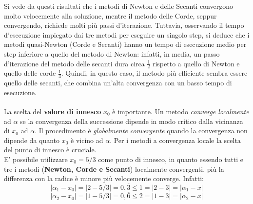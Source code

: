 Si vede da questi risultati che i metodi di Newton e delle Secanti convergono molto velocemente alla soluzione, mentre il metodo delle Corde, seppur convergendo, richiede molti più passi d'iterazione. Tuttavia, osservando il tempo d'esecuzione impiegato dai tre metodi per eseguire un singolo step, si deduce che i metodi quasi-Newton (Corde e Secanti) hanno un tempo di esecuzione medio per step inferiore a quello del metodo di Newton: infatti, in media, un passo d'iterazione del metodo delle secanti dura circa $\frac{1}{2}$ rispetto a quello di Newton e quello delle corde $\frac{1}{4}$. Quindi, in questo caso, il metodo più efficiente sembra essere quello delle secanti, che combina un'alta convergenza con un basso tempo di esecuzione.\\\\
La scelta del \textbf{valore di innesco} $x_{0}$ è importante. Un metodo \textit{converge localmente} ad $\alpha$ se la convergenza della successione dipende in modo critico dalla vicinanza di $x_{0}$ ad $\alpha$. Il procedimento è \textit{globalmente convergente} quando la convergenza non dipende da quanto $x_{0}$ è vicino ad $\alpha$. Per i metodi a convergenza locale la scelta del punto di innesco è cruciale.\\
E' possibile utilizzare $x_{0}=5/3$ come punto di innesco, in quanto essendo tutti e tre i metodi (\textbf{Newton, Corde e Secanti}) localmente convergenti, più la differenza con la radice è minore più velocemente converge. Infatti:
	\[
	|\alpha_1 - x_{0}| = |2 - 5/3| = 0,\overline{3} \leq 1 = |2 - 3| = |\alpha_1 - x|
	\]
	\[
	|\alpha_2 - x_{0}| = |1 - 5/3| = 0,\overline{6} \leq 2 = |1 - 3| = |\alpha_2 - x|
	\]